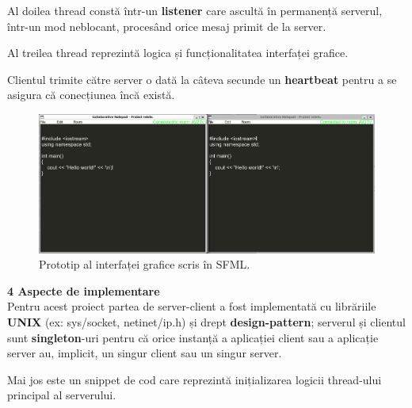 \documentclass[runningheads]{llncs}
\begin{document}
Al doilea thread constă într-un {\bf listener} care ascultă în permanență serverul, într-un mod neblocant, procesând orice mesaj primit de la server.

Al treilea thread reprezintă logica și funcționalitatea interfaței grafice.

Clientul trimite către server o dată la câteva secunde un {\bf heartbeat} pentru a se asigura că conecțiunea încă există.

\begin{figure}[htbp!]
    \hspace{-53px} 
    \includegraphics[scale=0.38]{camera4.png}
    \caption{Prototip al interfaței grafice scris în SFML.}
    \label{fig:yourlabel}
\end{figure}

\newpage
{\Large \bf 4 Aspecte de implementare} 
\\

Pentru acest proiect partea de server-client a fost implementată cu librăriile {\bf UNIX} (ex: sys/socket, netinet/ip.h) și drept {\bf design-pattern};
serverul și clientul sunt {\bf singleton}-uri pentru că orice instanță a aplicației client sau a aplicație server au, implicit, un singur client sau un singur server.

Mai jos este un snippet de cod care reprezintă inițializarea logicii thread-ului principal al serverului.
\\
\end{document}
